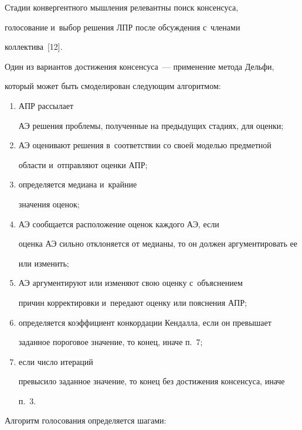   


  Стадии конвергентного мышления релевантны поиск консенсуса, 


голосование и~выбор решения ЛПР после обсуждения с~членами 


коллектива~[12]. 


  


  Один из вариантов достижения консенсуса~--- применение метода Дельфи, 


который может быть смоделирован следующим алгоритмом: 


\begin{enumerate}[(1)]


\item АПР рассылает 


АЭ решения проблемы, полученные на предыдущих стадиях, для оценки; 


\item АЭ оценивают решения в~соответствии со своей моделью предметной 


области и~отправляют оценки АПР; 


\item определяется медиана и~крайние 


значения оценок; 


\item АЭ сообщается расположение оценок каждого АЭ, если 


оценка АЭ сильно отклоняется от медианы, то он должен аргументировать ее 


или изменить; 


\item АЭ аргументируют или изменяют свою оценку с~объяснением 


причин корректировки и~передают оценку или пояснения АПР; 


\item определяется коэффициент конкордации Кендалла, если он превышает 


заданное пороговое значение, то конец, иначе п.~7; 


\item если число итераций 


превысило заданное значение, то конец без достижения консенсуса, иначе 


п.~3.


  \end{enumerate}


  


  Алгоритм голосования определяется шагами:


